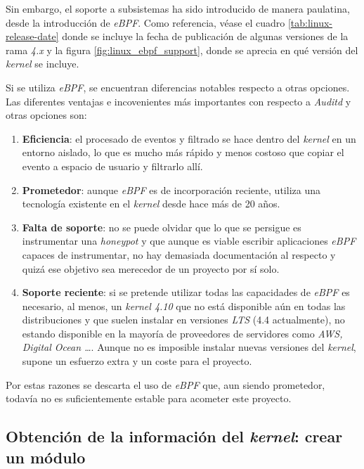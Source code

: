 Sin embargo, el soporte a subsistemas ha sido introducido de manera paulatina, desde la introducción de \emph{eBPF}. Como referencia, véase el cuadro \ref{tab:linux-release-date} donde se incluye la fecha de publicación de algunas versiones de la rama
\emph{4.x} y la figura \ref{fig:linux_ebpf_support}, donde se aprecia en qué versión del \emph{kernel} se incluye.

\clearpage


Si se utiliza \emph{eBPF}, se encuentran diferencias notables respecto a otras opciones. Las diferentes ventajas e incovenientes más importantes con respecto a \emph{Auditd} y otras opciones son:
\begin{enumerate}
    \item \textbf{Eficiencia}: el procesado de eventos y filtrado se hace dentro del \emph{kernel} en un entorno aislado, lo que es mucho más
    rápido y menos costoso que copiar el evento a espacio de usuario y filtrarlo allí.
    \item \textbf{Prometedor}: aunque \emph{eBPF} es de incorporación reciente, utiliza una tecnología existente en el \emph{kernel} desde hace más de 20 años.
    \item \textbf{Falta de soporte}: no se puede olvidar que lo que se persigue es instrumentar una \emph{honeypot} y que aunque es viable escribir aplicaciones \emph{eBPF} capaces de instrumentar, no hay demasiada documentación al respecto
    y quizá ese objetivo sea merecedor de un proyecto por sí solo.
    \item \textbf{Soporte reciente}: si se pretende utilizar todas las capacidades de \emph{eBPF} es necesario, al menos, un \emph{kernel 4.10} que no está disponible aún en todas las distribuciones y que suelen instalar en
    versiones \emph{LTS} (4.4 actualmente), no estando disponible en la mayoría de proveedores de servidores como \emph{AWS, Digital Ocean \ldots}. Aunque no es imposible instalar nuevas versiones del \emph{kernel},
    supone un esfuerzo extra y un coste para el proyecto.
\end{enumerate}

Por estas razones se descarta el uso de \emph{eBPF} que, aun siendo prometedor, todavía no es suficientemente estable para acometer este proyecto.
\clearpage

\subsection{Obtención de la información del \emph{kernel}: crear un módulo}
\label{subsec:kernel-modulo}

